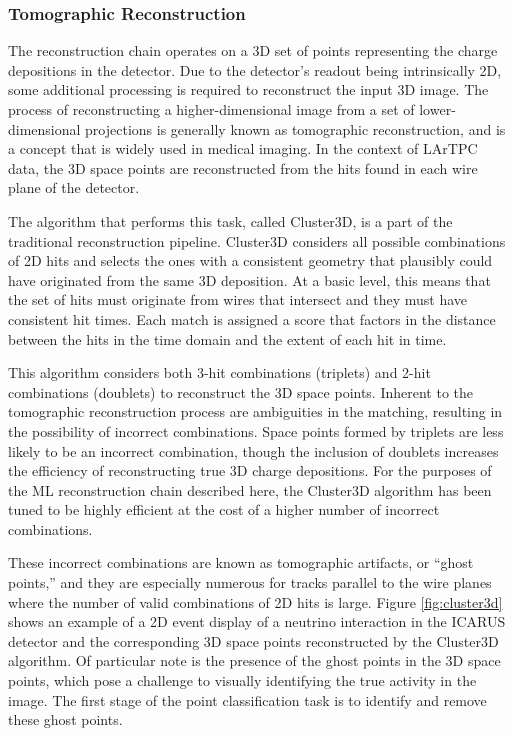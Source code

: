 \subsubsection{Tomographic Reconstruction}
\label{sec:tomographic_reconstruction}

The reconstruction chain operates on a 3D set of points representing the charge depositions in the detector. Due to the detector's readout being intrinsically 2D, some additional processing is required to reconstruct the input 3D image. The process of reconstructing a higher-dimensional image from a set of lower-dimensional projections is generally known as tomographic reconstruction, and is a concept that is widely used in medical imaging. In the context of LArTPC data, the 3D space points are reconstructed from the hits found in each wire plane of the detector.

The algorithm that performs this task, called Cluster3D, is a part of the traditional reconstruction pipeline. Cluster3D considers all possible combinations of 2D hits and selects the ones with a consistent geometry that plausibly could have originated from the same 3D deposition. At a basic level, this means that the set of hits must originate from wires that intersect and they must have consistent hit times. Each match is assigned a score that factors in the distance between the hits in the time domain and the extent of each hit in time.

This algorithm considers both 3-hit combinations (triplets) and 2-hit combinations (doublets) to reconstruct the 3D space points. Inherent to the tomographic reconstruction process are ambiguities in the matching, resulting in the possibility of incorrect combinations. Space points formed by triplets are less likely to be an incorrect combination, though the inclusion of doublets increases the efficiency of reconstructing true 3D charge depositions. For the purposes of the ML reconstruction chain described here, the Cluster3D algorithm has been tuned to be highly efficient at the cost of a higher number of incorrect combinations.

These incorrect combinations are known as tomographic artifacts, or ``ghost points,'' and they are especially numerous for tracks parallel to the wire planes where the number of valid combinations of 2D hits is large. Figure \ref{fig:cluster3d} shows an example of a 2D event display of a neutrino interaction in the ICARUS detector and the corresponding 3D space points reconstructed by the Cluster3D algorithm. Of particular note is the presence of the ghost points in the 3D space points, which pose a challenge to visually identifying the true activity in the image. The first stage of the point classification task is to identify and remove these ghost points.


